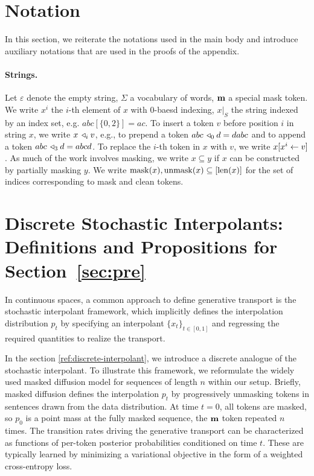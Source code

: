\section{Notation}
In this section, we reiterate the notations used in the main body and introduce auxiliary notations that are used in the proofs of the appendix.

\paragraph{Strings.} Let $\varepsilon$ denote the empty string, $\Sigma$ a vocabulary of words, $\mathbf{m}$ a special mask token. We write $x^i$ the $i$-th element of $x$ with 0-baesd indexing, $x|_S$ the string indexed by an index set, e.g. $abc[\{0, 2\}]=ac$. To insert a token $v$ before position $i$ in string $x$, we write $x\,\triangleleft_{i}v$, e.g., to prepend a token $abc\,\triangleleft_{0}d = dabc$ and to append a token $abc\,\triangleleft_{3}d=abcd$. To replace the $i$-th token in $x$ with $v$, we write $x[x^{i} \leftarrow v]$. As much of the work involves masking, we write $x \subseteq y$ if $x$ can be constructed by partially masking $y$. We write $\mathrm{mask}(x), \mathrm{unmask}(x) \subseteq[\mathrm{len}(x)]$ for the set of indices corresponding to mask and clean tokens.


\section{Discrete Stochastic Interpolants: Definitions and Propositions for Section~\ref{sec:pre}} 
\label{sec:appendix_theory_interpolant}

In continuous spaces, a common approach to define generative transport is the stochastic interpolant framework, which implicitly defines the interpolation distribution $p_t$ by specifying an interpolant $\{x_t\}_{t\in[0,1]}$ and regressing the required quantities to realize the transport.

In the section \ref{ref:discrete-interpolant}, we introduce a discrete analogue of the stochastic interpolant. To illustrate this framework, we reformulate the widely used masked diffusion model for sequences of length $n$ within our setup. Briefly, masked diffusion defines the interpolation $p_t$ by progressively unmasking tokens in sentences drawn from the data distribution. At time $t=0$, all tokens are masked, so $p_0$ is a point mass at the fully masked sequence, the $\mathbf{m}$ token repeated $n$ times. The transition rates driving the generative transport can be characterized as functions of per-token posterior probabilities conditioned on time $t$. These are typically learned by minimizing a variational objective in the form of a weighted cross-entropy loss.


